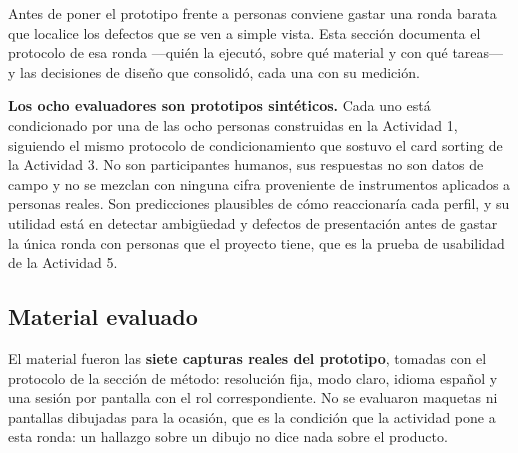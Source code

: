 %
%
%


Antes de poner el prototipo frente a personas conviene gastar una ronda barata que localice los
defectos que se ven a simple vista. Esta sección documenta el protocolo de esa ronda ---quién la
ejecutó, sobre qué material y con qué tareas--- y las decisiones de diseño que consolidó, cada una
con su medición.

\textbf{Los ocho evaluadores son prototipos sintéticos.} Cada uno está condicionado por una de las
ocho personas construidas en la Actividad 1, siguiendo el mismo protocolo de condicionamiento que
sostuvo el card sorting de la Actividad 3. No son participantes humanos, sus respuestas no son datos
de campo y no se mezclan con ninguna cifra proveniente de instrumentos aplicados a personas reales.
Son predicciones plausibles de cómo reaccionaría cada perfil, y su utilidad está en detectar
ambigüedad y defectos de presentación antes de gastar la única ronda con personas que el proyecto
tiene, que es la prueba de usabilidad de la Actividad 5.

\subsection{Material evaluado}

El material fueron las \textbf{siete capturas reales del prototipo}, tomadas con el protocolo de la
sección de método: resolución fija, modo claro, idioma español y una sesión por pantalla con el rol
correspondiente. No se evaluaron maquetas ni pantallas dibujadas para la ocasión, que es la
condición que la actividad pone a esta ronda: un hallazgo sobre un dibujo no dice nada sobre el
producto.

